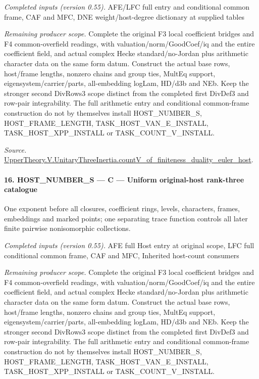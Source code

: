\documentclass[11pt,a4paper]{article}
\numberwithin{equation}{section}
\theoremstyle{remark}\newtheorem{remark}[theorem]{Remark}
\begin{document}
\emph{Completed inputs (version 0.55).} AFE/LFC full entry and conditional common frame, CAF and MFC, DNE weight/host-degree dictionary at supplied tables

\emph{Remaining producer scope.} Complete the original F3 local coefficient bridges and F4 common-overfield readings, with valuation/norm/GoodCoef/iq and the entire coefficient field, and actual complex Hecke standard/no-Jordan plus arithmetic character data on the same form datum. Construct the actual base rows, host/frame lengths, nonzero chains and group ties, MultEq support, eigensystem/carrier/parts, all-embedding logLam, HD/d3b and NEb. Keep the stronger second DivRows3 scope distinct from the completed first DivDef3 and row-pair integrability. The full arithmetic entry and conditional common-frame construction do not by themselves install HOST\_\allowbreak NUMBER\_\allowbreak S, HOST\_\allowbreak FRAME\_\allowbreak LENGTH, TASK\_\allowbreak HOST\_\allowbreak VAN\_\allowbreak E\_\allowbreak INSTALL, TASK\_\allowbreak HOST\_\allowbreak XPP\_\allowbreak INSTALL or TASK\_\allowbreak COUNT\_\allowbreak V\_\allowbreak INSTALL.

\emph{Source.} \href{https://github.com/CocoSgt/riemann-hypothesis-lean/blob/7cbf7a0c32fca1badf05931879a37c3f8a2b03b4/src/Development/AutomorphicArithmetic/AutomorphicVarieties/ModularityArgument/ThresholdArguments/DenseThresholdCases/CountVOf.lean#L33-L60}{UpperTheory.V.UnitaryThreeInertia.countV\_\allowbreak of\_\allowbreak finiteness\_\allowbreak duality\_\allowbreak euler\_\allowbreak host}.



\paragraph{16. HOST\_\allowbreak NUMBER\_\allowbreak S — C — Uniform original-host rank-three catalogue}

One exponent before all closures, coefficient rings, levels, characters, frames, embeddings and marked points; one separating trace function controls all later finite pairwise nonisomorphic collections.

\emph{Completed inputs (version 0.55).} AFE full Host entry at original scope, LFC full conditional common frame, CAF and MFC, Inherited host-count consumers

\emph{Remaining producer scope.} Complete the original F3 local coefficient bridges and F4 common-overfield readings, with valuation/norm/GoodCoef/iq and the entire coefficient field, and actual complex Hecke standard/no-Jordan plus arithmetic character data on the same form datum. Construct the actual base rows, host/frame lengths, nonzero chains and group ties, MultEq support, eigensystem/carrier/parts, all-embedding logLam, HD/d3b and NEb. Keep the stronger second DivRows3 scope distinct from the completed first DivDef3 and row-pair integrability. The full arithmetic entry and conditional common-frame construction do not by themselves install HOST\_\allowbreak NUMBER\_\allowbreak S, HOST\_\allowbreak FRAME\_\allowbreak LENGTH, TASK\_\allowbreak HOST\_\allowbreak VAN\_\allowbreak E\_\allowbreak INSTALL, TASK\_\allowbreak HOST\_\allowbreak XPP\_\allowbreak INSTALL or TASK\_\allowbreak COUNT\_\allowbreak V\_\allowbreak INSTALL.
\end{document}

